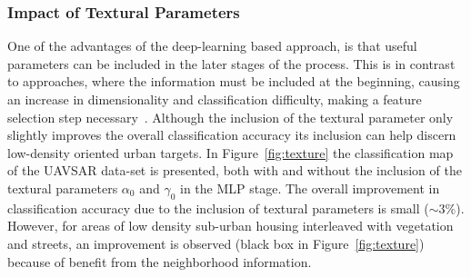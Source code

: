 \subsubsection{Impact of Textural Parameters}
\label{sec:EXPT0}
One of the advantages of the deep-learning based approach, is that useful parameters can be included in the later stages of the process. This is in contrast to approaches, where the information must be included at the beginning, causing an increase in dimensionality and classification difficulty, making a feature selection step necessary~\cite{tao2015tensorial,banerjee2014generic}.
Although the inclusion of the textural parameter only slightly improves the overall classification accuracy its inclusion can help discern low-density oriented urban targets. In Figure~\ref{fig:texture} the classification map of the UAVSAR data-set is presented, both with and without the inclusion of the textural parameters $\alpha_0$ and $\gamma_0$ in the MLP stage. The overall improvement in classification accuracy due to the inclusion of textural parameters is small ($\sim 3\%$).  However, for areas of low density sub-urban housing interleaved with vegetation and streets, an improvement is observed (black box in Figure~\ref{fig:texture}) because of benefit from the neighborhood information.  







